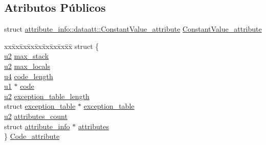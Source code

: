 \subsection*{Atributos Públicos}
\begin{DoxyCompactItemize}
\item 
struct \hyperlink{structattribute__info_1_1dataatt_1_1ConstantValue__attribute}{attribute\+\_\+info\+::dataatt\+::\+Constant\+Value\+\_\+attribute} \hyperlink{unionattribute__info_1_1dataatt_a7528732c04d522ee66b03ac3ee68a328}{Constant\+Value\+\_\+attribute}
\item 
\begin{tabbing}
xx\=xx\=xx\=xx\=xx\=xx\=xx\=xx\=xx\=\kill
struct \{\\
\>\hyperlink{ClassLoader_8h_a5f223212eef04d10a4550ded680cb1cf}{u2} \hyperlink{unionattribute__info_1_1dataatt_a5324cb4f9387dd83fbf918a214e9ecf5}{max\_stack}\\
\>\hyperlink{ClassLoader_8h_a5f223212eef04d10a4550ded680cb1cf}{u2} \hyperlink{unionattribute__info_1_1dataatt_a50f68cdf74cc0a4ae6cfdff4f9deff56}{max\_locals}\\
\>\hyperlink{ClassLoader_8h_aedf6ddc03df8caaaccbb4c60b9a9b850}{u4} \hyperlink{unionattribute__info_1_1dataatt_a632ec76b539aef919ad1b53bc06ae202}{code\_length}\\
\>\hyperlink{ClassLoader_8h_a216a9f8b04b4f0af84a4ca9d1d85a6ca}{u1} $\ast$ \hyperlink{unionattribute__info_1_1dataatt_ae358021d0aeaf42c2946d7ca9bde4561}{code}\\
\>\hyperlink{ClassLoader_8h_a5f223212eef04d10a4550ded680cb1cf}{u2} \hyperlink{unionattribute__info_1_1dataatt_aab4fba017aae830c5d0ee6e5498c4e0a}{exception\_table\_length}\\
\>struct \hyperlink{structexception__table}{exception\_table} $\ast$ \hyperlink{unionattribute__info_1_1dataatt_ad8651df15e6a1ce7795fb5bbfc036497}{exception\_table}\\
\>\hyperlink{ClassLoader_8h_a5f223212eef04d10a4550ded680cb1cf}{u2} \hyperlink{unionattribute__info_1_1dataatt_a2684a4c2f7e2e9bf618563c5aa3f0bad}{attributes\_count}\\
\>struct \hyperlink{structattribute__info}{attribute\_info} $\ast$ \hyperlink{unionattribute__info_1_1dataatt_a3e6b34fe04111fe1a6b2d386d7c7e4f3}{attributes}\\
\} \hyperlink{unionattribute__info_1_1dataatt_ab0774fa2b3c172330d4428a0be7c9819}{Code\_attribute}\\


\end{tabbing}
\end{DoxyCompactItemize}
